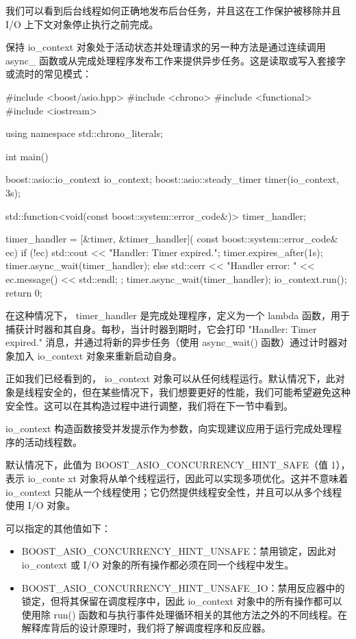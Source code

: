 我们可以看到后台线程如何正确地发布后台任务，并且这在工作保护被移除并且 I/O 上下文对象停止执行之前完成。

保持 io\_context 对象处于活动状态并处理请求的另一种方法是通过连续调用 async\_ 函数或从完成处理程序发布工作来提供异步任务。这是读取或写入套接字或流时的常见模式：

\begin{cpp}
#include <boost/asio.hpp>
#include <chrono>
#include <functional>
#include <iostream>

using namespace std::chrono_literals;

int main() {
    boost::asio::io_context io_context;
    boost::asio::steady_timer timer(io_context, 3s);

    std::function<void(const boost::system::error_code&)>
                    timer_handler;

    timer_handler = [&timer, &timer_handler](
                    const boost::system::error_code& ec) {
        if (!ec) {
            std::cout << "Handler: Timer expired.\n";
            timer.expires_after(1s);
            timer.async_wait(timer_handler);
        } else {
            std::cerr << "Handler error: "
                      << ec.message() << std::endl;
            }
        };
    timer.async_wait(timer_handler);
    io_context.run();
    return 0;
}
\end{cpp}

在这种情况下， timer\_handler 是完成处理程序，定义为一个 lambda 函数，用于捕获计时器和其自身。每秒，当计时器到期时，它会打印 "Handler: Timer expired." 消息，并通过将新的异步任务（使用 async\_wait() 函数）通过计时器对象加入 io\_context 对象来重新启动自身。

正如我们已经看到的， io\_context 对象可以从任何线程运行。默认情况下，此对象是线程安全的，但在某些情况下，我们想要更好的性能，我们可能希望避免这种安全性。这可以在其构造过程中进行调整，我们将在下一节中看到。


io\_context 构造函数接受并发提示作为参数，向实现建议应用于运行完成处理程序的活动线程数。

默认情况下，此值为 BOOST\_ASIO\_CONCURRENCY\_HINT\_SAFE（值 1），表示 io\_conte xt 对象将从单个线程运行，因此可以实现多项优化。这并不意味着 io\_context 只能从一个线程使用；它仍然提供线程安全性，并且可以从多个线程使用 I/O 对象。

可以指定的其他值如下：

\begin{itemize}
\item
BOOST\_ASIO\_CONCURRENCY\_HINT\_UNSAFE：禁用锁定，因此对 io\_context 或 I/O 对象的所有操作都必须在同一个线程中发生。

\item
BOOST\_ASIO\_CONCURRENCY\_HINT\_UNSAFE\_IO：禁用反应器中的锁定，但将其保留在调度程序中，因此 io\_context 对象中的所有操作都可以使用除 run() 函数和与执行事件处理循环相关的其他方法之外的不同线程。在解释库背后的设计原理时，我们将了解调度程序和反应器。
\end{itemize}

